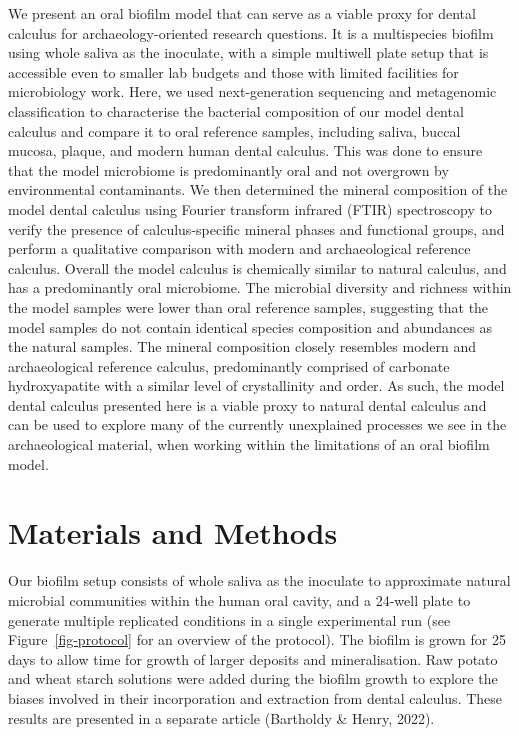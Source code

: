 \documentclass[
]{article}
\begin{document}
We present an oral biofilm model that can serve as a viable proxy for
dental calculus for archaeology-oriented research questions. It is a
multispecies biofilm using whole saliva as the inoculate, with a simple
multiwell plate setup that is accessible even to smaller lab budgets and
those with limited facilities for microbiology work. Here, we used
next-generation sequencing and metagenomic classification to
characterise the bacterial composition of our model dental calculus and
compare it to oral reference samples, including saliva, buccal mucosa,
plaque, and modern human dental calculus. This was done to ensure that
the model microbiome is predominantly oral and not overgrown by
environmental contaminants. We then determined the mineral composition
of the model dental calculus using Fourier transform infrared (FTIR)
spectroscopy to verify the presence of calculus-specific mineral phases
and functional groups, and perform a qualitative comparison with modern
and archaeological reference calculus. Overall the model calculus is
chemically similar to natural calculus, and has a predominantly oral
microbiome. The microbial diversity and richness within the model
samples were lower than oral reference samples, suggesting that the
model samples do not contain identical species composition and
abundances as the natural samples. The mineral composition closely
resembles modern and archaeological reference calculus, predominantly
comprised of carbonate hydroxyapatite with a similar level of
crystallinity and order. As such, the model dental calculus presented
here is a viable proxy to natural dental calculus and can be used to
explore many of the currently unexplained processes we see in the
archaeological material, when working within the limitations of an oral
biofilm model.

\hypertarget{materials-and-methods}{%
\section{Materials and Methods}\label{materials-and-methods}}

Our biofilm setup consists of whole saliva as the inoculate to
approximate natural microbial communities within the human oral cavity,
and a 24-well plate to generate multiple replicated conditions in a
single experimental run (see Figure~\ref{fig-protocol} for an overview
of the protocol). The biofilm is grown for 25 days to allow time for
growth of larger deposits and mineralisation. Raw potato and wheat
starch solutions were added during the biofilm growth to explore the
biases involved in their incorporation and extraction from dental
calculus. These results are presented in a separate article (Bartholdy
\& Henry, 2022).
\end{document}
